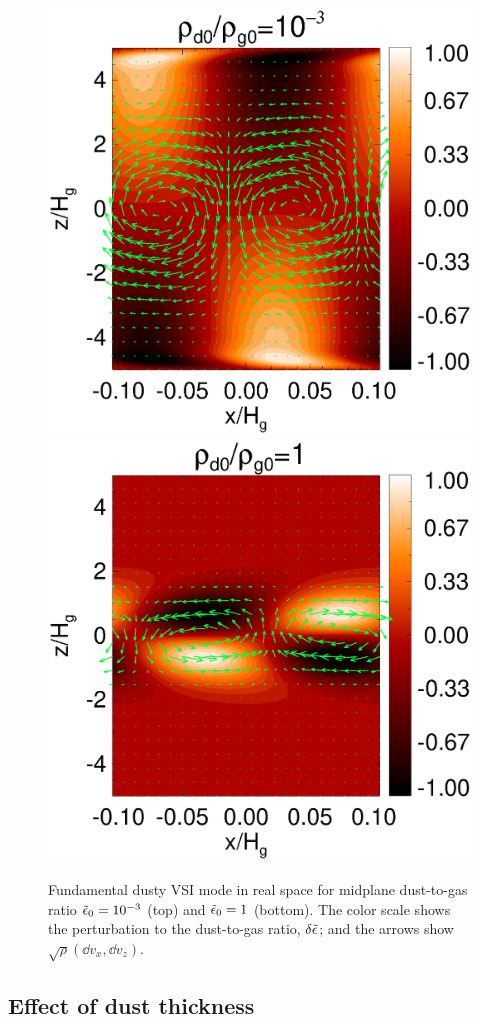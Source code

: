 \begin{figure}
  \includegraphics[scale=0.54, clip=true, trim=0cm 2.5cm 0cm 0cm]{figures/result2d_dg1d-3.ps}\\
  \includegraphics[scale=0.54]{figures/result2d_dg1.ps} 
  \caption{Fundamental dusty VSI mode in real space for midplane dust-to-gas
    ratio $\tilde{\epsilon}_0=10^{-3}$ (top) and $\tilde{\epsilon}_0=1$
    (bottom). The color scale shows the perturbation to the
    dust-to-gas ratio, $\delta\tilde{\epsilon}$; and the arrows show
    $\sqrt{\rho}\left(\dd v_x, \dd v_z\right)$. 
    \label{vsi_dust_loading2d}
    }
\end{figure}



\subsection{Effect of dust thickness}
